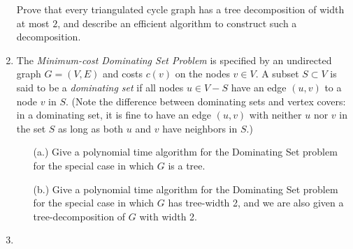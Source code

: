 \documentclass[12pt]{article}
\def\setminus{{-}}
\begin{document}
\begin{enumerate}
Prove that every triangulated cycle graph has a
tree decomposition of width at most $2$,
and describe an efficient algorithm to construct
such a decomposition.



\item 

The {\em Minimum-cost Dominating Set
Problem} is specified by an undirected
graph $G=(V,E)$ and costs $c(v)$ on the nodes $v \in V$. A subset $S \subset V$
is said to be a {\em dominating set}
if all nodes $u \in V\setminus S$ have an edge
$(u,v)$ to a node $v$ in $S$. (Note the difference between dominating
sets and vertex covers: in a dominating set, it is fine to have an edge $(u,v)$
with neither $u$ nor $v$ in the set $S$ as long as both $u$ and $v$ have
neighbors in $S$.)
\begin{itemize}
\item[(a.)] Give a polynomial time algorithm for the  Dominating Set problem
for the special case in which $G$ is a tree.
\item[(b.)] Give a polynomial time algorithm for the  Dominating Set problem
for the special case in which $G$ has tree-width 2, and we are also given
a tree-decomposition of $G$ with width 2.
\end{itemize}


\item


\end{enumerate}
\end{document}
